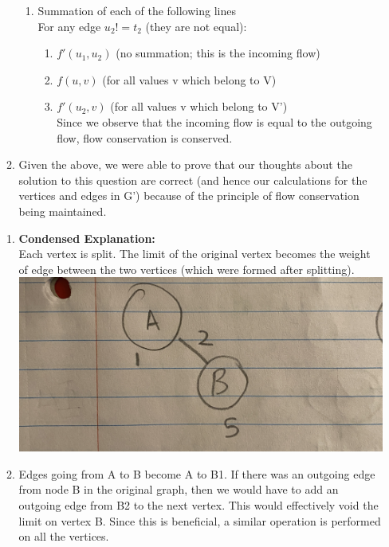 \documentclass[11pt]{article}
\begin{document}
\begin{enumerate}
\begin{enumerate}
    \begin{enumerate}
        \item Summation of each of the following lines\\
        For any edge $u_2 != t_2$ (they are not equal): 
        \begin{enumerate}
            \item $f'(u_1, u_2)$ (no summation; this is the incoming flow)
            \item $f(u, v)$ (for all values v which belong to V)
            \item $f'(u_2, v)$ (for all values v which belong to V')\\Since we observe that the incoming flow is equal to the outgoing flow, flow conservation is conserved.
        \end{enumerate}
    \end{enumerate}
    \item Given the above, we were able to prove that our thoughts about the solution to this question are correct (and hence our calculations for the vertices and edges in G’) because of the principle of flow conservation being maintained. 
\end{enumerate}
\begin{enumerate}
    \item \textbf{Condensed Explanation:}\\
    Each vertex is split. The limit of the original vertex becomes the weight of edge between the two vertices (which were formed after splitting). \\
    \includegraphics[scale=0.1]{IMG_8564.JPG}
    \item Edges going from A to B become A to B1. If there was an outgoing edge from node B in the original graph, then we would have to add an outgoing edge from B2 to the next vertex. This would effectively void the limit on vertex B. Since this is beneficial, a similar operation is performed on all the vertices.\\

\end{enumerate}
\end{enumerate}
\end{document}

